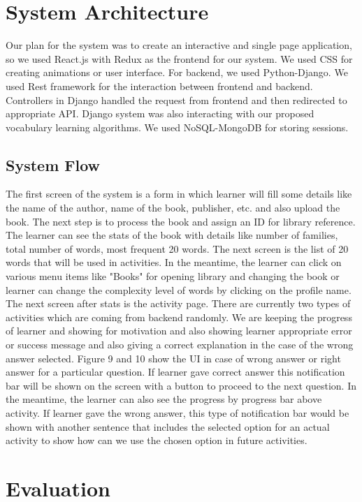 \documentclass[11pt,a4paper]{article}
\begin{document}
\section{System Architecture}
Our plan for the system was to create an interactive and single page application, so we used React.js with Redux as the frontend for our system. We used CSS for creating animations or user interface. For backend, we used Python-Django. We used Rest framework for the interaction between frontend and backend. Controllers in Django handled the request from frontend and then redirected to appropriate API. Django system was also interacting with our proposed vocabulary learning algorithms. We used NoSQL-MongoDB for storing sessions.   



\subsection{System Flow}
The first screen of the system is a form in which learner will fill some details like the name of the author, name of the book, publisher, etc. and also upload the book. The next step is to process the book and assign an ID for library reference. The learner can see the stats of the book with details like number of families, total number of words, most frequent 20 words. 
The next screen is the list of 20 words that will be used in activities. In the meantime, the learner can click on various menu items like "Books" for opening library and changing the book or learner can change the complexity level of words by clicking on the profile name. The next screen after stats is the activity page. There are currently two types of activities which are coming from backend randomly. We are keeping the progress of learner and showing for motivation and also showing learner appropriate error or success message and also giving a correct explanation in the case of the wrong answer selected. Figure 9 and 10 show the UI in case of wrong answer or right answer for a particular question. If learner gave correct answer this notification bar will be shown on the screen with a button to proceed to the next question. In the meantime, the learner can also see the progress by progress bar above activity. If learner gave the wrong answer, this type of notification bar would be shown with another sentence that includes the selected option for an actual activity to show how can we use the chosen option in future activities.

\section{Evaluation}
\end{document}
